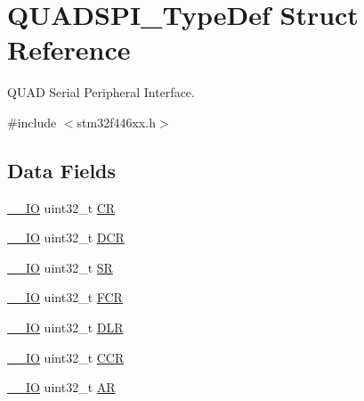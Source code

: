 \hypertarget{struct_q_u_a_d_s_p_i___type_def}{}\section{Q\+U\+A\+D\+S\+P\+I\+\_\+\+Type\+Def Struct Reference}
\label{struct_q_u_a_d_s_p_i___type_def}


Q\+U\+AD Serial Peripheral Interface.  




{\ttfamily \#include $<$stm32f446xx.\+h$>$}

\subsection*{Data Fields}
\begin{DoxyCompactItemize}
\item 
\mbox{\hyperlink{core__sc300_8h_aec43007d9998a0a0e01faede4133d6be}{\+\_\+\+\_\+\+IO}} uint32\+\_\+t \mbox{\hyperlink{struct_q_u_a_d_s_p_i___type_def_ab40c89c59391aaa9d9a8ec011dd0907a}{CR}}
\item 
\mbox{\hyperlink{core__sc300_8h_aec43007d9998a0a0e01faede4133d6be}{\+\_\+\+\_\+\+IO}} uint32\+\_\+t \mbox{\hyperlink{struct_q_u_a_d_s_p_i___type_def_af6225cb8f4938f98204d11afaffd41c9}{D\+CR}}
\item 
\mbox{\hyperlink{core__sc300_8h_aec43007d9998a0a0e01faede4133d6be}{\+\_\+\+\_\+\+IO}} uint32\+\_\+t \mbox{\hyperlink{struct_q_u_a_d_s_p_i___type_def_af6aca2bbd40c0fb6df7c3aebe224a360}{SR}}
\item 
\mbox{\hyperlink{core__sc300_8h_aec43007d9998a0a0e01faede4133d6be}{\+\_\+\+\_\+\+IO}} uint32\+\_\+t \mbox{\hyperlink{struct_q_u_a_d_s_p_i___type_def_a5d5cc7f32884945503dd29f8f6cbb415}{F\+CR}}
\item 
\mbox{\hyperlink{core__sc300_8h_aec43007d9998a0a0e01faede4133d6be}{\+\_\+\+\_\+\+IO}} uint32\+\_\+t \mbox{\hyperlink{struct_q_u_a_d_s_p_i___type_def_a651b3980342dcf21d301d29621dcf4f6}{D\+LR}}
\item 
\mbox{\hyperlink{core__sc300_8h_aec43007d9998a0a0e01faede4133d6be}{\+\_\+\+\_\+\+IO}} uint32\+\_\+t \mbox{\hyperlink{struct_q_u_a_d_s_p_i___type_def_a5e1322e27c40bf91d172f9673f205c97}{C\+CR}}
\item 
\mbox{\hyperlink{core__sc300_8h_aec43007d9998a0a0e01faede4133d6be}{\+\_\+\+\_\+\+IO}} uint32\+\_\+t \mbox{\hyperlink{struct_q_u_a_d_s_p_i___type_def_a2ac50357d1ebac2949d27bfc4855e6a4}{AR}}
\item 

\end{DoxyCompactItemize}
